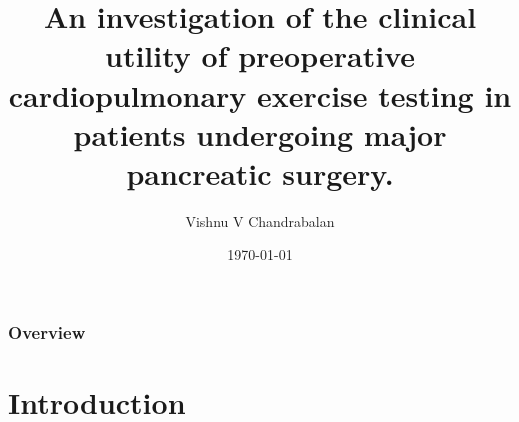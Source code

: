 \documentclass[10pt]{beamer}
\title[Improving Outcomes in Pancreatic Surgery]{An investigation of the clinical utility of preoperative cardiopulmonary exercise testing in patients undergoing major pancreatic surgery.} %
\author{Vishnu V Chandrabalan} %
\institute[UoG] %
{
University of Glasgow \\ %
\medskip
}
\date{\today} %
\begin{document}
\begin{frame}
\titlepage %
\end{frame}


\begin{frame}
\frametitle{Overview} %
\tableofcontents %
\end{frame}


\section[Chapter 1]{Introduction}
\end{document}
